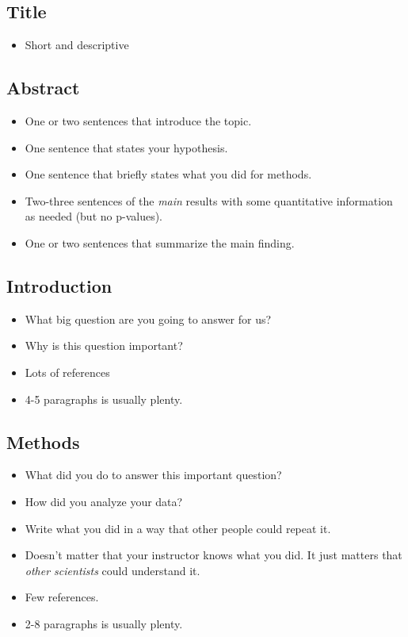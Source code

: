 \documentclass[
]{article}
\providecommand{\tightlist}{%
  \setlength{\itemsep}{0pt}\setlength{\parskip}{0pt}}
\begin{document}
\hypertarget{title}{%
\subsection{Title}\label{title}}

\begin{itemize}
\tightlist
\item
  Short and descriptive
\end{itemize}

\hypertarget{abstract}{%
\subsection{Abstract}\label{abstract}}

\begin{itemize}
\tightlist
\item
  One or two sentences that introduce the topic.
\item
  One sentence that states your hypothesis.
\item
  One sentence that briefly states what you did for methods.
\item
  Two-three sentences of the \emph{main} results with some quantitative
  information as needed (but no p-values).
\item
  One or two sentences that summarize the main finding.
\end{itemize}

\hypertarget{introduction}{%
\subsection{Introduction}\label{introduction}}

\begin{itemize}
\tightlist
\item
  What big question are you going to answer for us?
\item
  Why is this question important?
\item
  Lots of references
\item
  4-5 paragraphs is usually plenty.
\end{itemize}

\hypertarget{methods}{%
\subsection{Methods}\label{methods}}

\begin{itemize}
\tightlist
\item
  What did you do to answer this important question?
\item
  How did you analyze your data?
\item
  Write what you did in a way that other people could repeat it.
\item
  Doesn't matter that your instructor knows what you did. It just
  matters that \emph{other scientists} could understand it.
\item
  Few references.
\item
  2-8 paragraphs is usually plenty.
\end{itemize}
\end{document}
